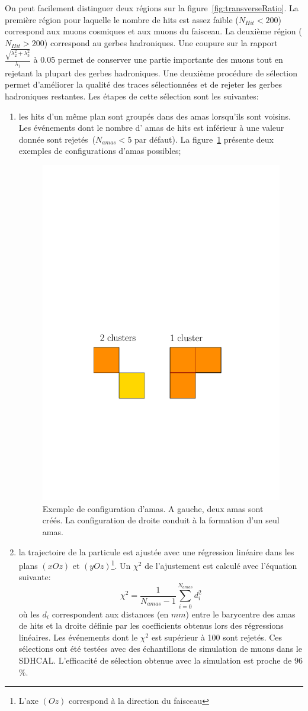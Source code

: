 On peut facilement distinguer deux régions sur la figure~\ref{fig:transverseRatio}. La première région pour laquelle le nombre de hits est assez faible ($N_{Hit}<200$) correspond aux muons cosmiques et aux muons du faisceau. La deuxième région ($N_{Hit}>200$) correspond au gerbes hadroniques. Une coupure sur la rapport $\frac{\sqrt{\lambda_2^2+\lambda_3^2}}{\lambda_1}$ à 0.05 permet de conserver une partie importante des muons tout en rejetant la plupart des gerbes hadroniques. Une deuxième procédure de sélection permet d'améliorer la qualité des traces sélectionnées et de rejeter les gerbes hadroniques restantes. Les étapes de cette sélection sont les suivantes:
\begin{enumerate}[-]
\item les hits d'un même plan sont groupés dans des amas lorsqu'ils sont voisins. Les événements dont le nombre d' amas de hits est inférieur à une valeur donnée sont rejetés~($N_{amas}<5$ par défaut). La figure~\ref{fig:amas} présente deux exemples de configurations d'amas possibles;
\begin{figure}[!ht]
  \begin{center}
    \includegraphics[width=.5\textwidth]{SDHCAL/figs/Clusters.pdf}
    \caption{Exemple de configuration d'amas. A gauche, deux amas sont créés. La configuration de droite conduit à la formation d'un seul amas.}
    \label{fig:amas}
  \end{center}
\end{figure}
\item la trajectoire de la particule est ajustée avec une régression linéaire dans les plans $(xOz)$ et $(yOz)$\footnote{L'axe $(Oz)$ correspond à la direction du faisceau}. Un $\chi^2$ de l'ajustement est calculé  avec l'équation suivante:
  \begin{equation}
    \chi^2=\frac{1}{N_{amas}-1}\sum_{i=0}^{N_{amas}}d_i^2
  \end{equation}
où les $d_i$ correspondent aux distances (en $mm$) entre le barycentre des amas de hits et la droite définie par les coefficients obtenus lors des régressions linéaires. Les événements dont le $\chi^2$ est supérieur à 100 sont rejetés. Ces sélections ont été testées avec des échantillons de simulation de muons dans le SDHCAL. L'efficacité de sélection obtenue avec la simulation est proche de 96$\%$.
\end{enumerate}
